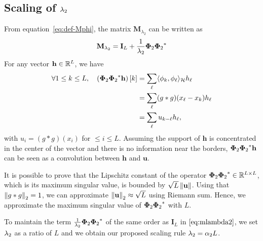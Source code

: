    \subsection{Scaling of \texorpdfstring{$\lambda_{2}$}{lambda 2}}
    From equation~\eqref{eq:def-Mphi}, the matrix $\mathbf{M}_{\lambda_2}$ can be written as
    \begin{equation}
        \label{eq:mlambda2}
        \mathbf{M}_{\lambda_{2}} = \mathbf{I}_L +  \frac{1}{\lambda_{2}}{\bm{\Phi}_2}{\bm{\Phi}_2}^*
    \end{equation}
    For any vector $\mathbf{h} \in \mathbb{R}^L$, we have
    \begin{align*}
        \forall 1 \leq k \leq L, \quad \left({\bm{\Phi}_2}{\bm{\Phi}_2}^*\mathbf{h}\right)[k] &= \sum_\ell \langle \phi_k , \phi_\ell \rangle_{\mathcal{H}} h_\ell \\
            &= \sum_\ell (g * g)(x_\ell - x_k) h_\ell \\
            &= \sum_\ell u_{k - \ell} h_\ell,
    \end{align*}
    with $u_i = (g * g)(x_i)$ for $ \leq i \leq L$. Assuming the support of $\mathbf{h}$ is concentrated in the center of the vector and there is no information near the borders, ${\bm{\Phi}_2}{\bm{\Phi}_2}^*\mathbf{h}$ can be seen as a convolution between $\mathbf{h}$ and $\mathbf{u}$.

    It is possible to prove that the Lipschitz constant of the operator ${\bm{\Phi}_2}{\bm{\Phi}_2}^* \in \mathbb{R}^{L \times L}$, which is its maximum singular value, is bounded by $\sqrt{L} \left\lVert\mathbf{u}\right\rVert$. Using that $\left\lVert g*g\right\rVert_2 = 1$, we can approximate $\left\lVert\mathbf{u}\right\rVert_2 \approx \sqrt{L}$ using Riemann sum. Hence, we approximate the maximum singular value of ${\bm{\Phi}_2}{\bm{\Phi}_2}^*$ with $L$.

    To maintain the term $\frac{1}{\lambda_{2}} {\bm{\Phi}_2}{\bm{\Phi}_2}^*$ of the same order as $\mathbf{I}_L$ in $\eqref{eq:mlambda2}$, we set $\lambda_{2}$ as a ratio of $L$ and we obtain our proposed scaling rule $\lambda_{2} = \alpha_2 L$.
    




        
